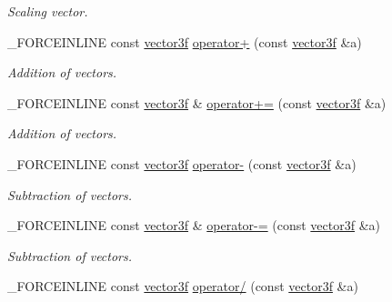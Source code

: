 \begin{DoxyCompactItemize}
\begin{DoxyCompactList}\small\item\em Scaling vector. \end{DoxyCompactList}\item 
\hypertarget{classbt_1_1vector3f_ad79aed30c82852cc9c19395679c7e471}{\-\_\-\-F\-O\-R\-C\-E\-I\-N\-L\-I\-N\-E const \hyperlink{classbt_1_1vector3f}{vector3f} \hyperlink{classbt_1_1vector3f_ad79aed30c82852cc9c19395679c7e471}{operator+} (const \hyperlink{classbt_1_1vector3f}{vector3f} \&a)}\label{classbt_1_1vector3f_ad79aed30c82852cc9c19395679c7e471}

\begin{DoxyCompactList}\small\item\em Addition of vectors. \end{DoxyCompactList}\item 
\hypertarget{classbt_1_1vector3f_ad162fd6b20ded982a728c449360a0fc5}{\-\_\-\-F\-O\-R\-C\-E\-I\-N\-L\-I\-N\-E const \hyperlink{classbt_1_1vector3f}{vector3f} \& \hyperlink{classbt_1_1vector3f_ad162fd6b20ded982a728c449360a0fc5}{operator+=} (const \hyperlink{classbt_1_1vector3f}{vector3f} \&a)}\label{classbt_1_1vector3f_ad162fd6b20ded982a728c449360a0fc5}

\begin{DoxyCompactList}\small\item\em Addition of vectors. \end{DoxyCompactList}\item 
\hypertarget{classbt_1_1vector3f_ad17c659a3bc265436178cb211c6a32d3}{\-\_\-\-F\-O\-R\-C\-E\-I\-N\-L\-I\-N\-E const \hyperlink{classbt_1_1vector3f}{vector3f} \hyperlink{classbt_1_1vector3f_ad17c659a3bc265436178cb211c6a32d3}{operator-\/} (const \hyperlink{classbt_1_1vector3f}{vector3f} \&a)}\label{classbt_1_1vector3f_ad17c659a3bc265436178cb211c6a32d3}

\begin{DoxyCompactList}\small\item\em Subtraction of vectors. \end{DoxyCompactList}\item 
\hypertarget{classbt_1_1vector3f_ae832c76f78cc8a3f5823e1b39e959fa7}{\-\_\-\-F\-O\-R\-C\-E\-I\-N\-L\-I\-N\-E const \hyperlink{classbt_1_1vector3f}{vector3f} \& \hyperlink{classbt_1_1vector3f_ae832c76f78cc8a3f5823e1b39e959fa7}{operator-\/=} (const \hyperlink{classbt_1_1vector3f}{vector3f} \&a)}\label{classbt_1_1vector3f_ae832c76f78cc8a3f5823e1b39e959fa7}

\begin{DoxyCompactList}\small\item\em Subtraction of vectors. \end{DoxyCompactList}\item 
\hypertarget{classbt_1_1vector3f_a6c63cf8eaa6b2e3961b9ce051a7b83ab}{\-\_\-\-F\-O\-R\-C\-E\-I\-N\-L\-I\-N\-E const \hyperlink{classbt_1_1vector3f}{vector3f} \hyperlink{classbt_1_1vector3f_a6c63cf8eaa6b2e3961b9ce051a7b83ab}{operator/} (const \hyperlink{classbt_1_1vector3f}{vector3f} \&a)}\label{classbt_1_1vector3f_a6c63cf8eaa6b2e3961b9ce051a7b83ab}


\end{DoxyCompactItemize}
